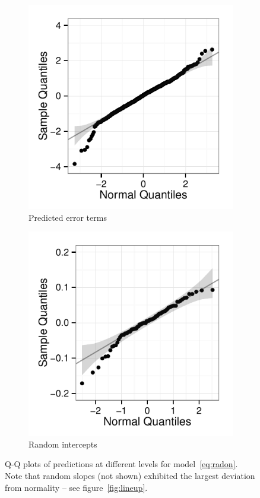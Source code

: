\documentclass[11pt]{article} %
\begin{document}
\begin{figure}[htb]
	\centering
	  \begin{subfigure}[b]{0.4\linewidth}
		\includegraphics[width=\linewidth]{raw-lev1-qq.pdf}
		\caption{Predicted error terms}
	  \end{subfigure}	
	  \begin{subfigure}[b]{0.4\linewidth}
	\includegraphics[width=\linewidth]{raw-intercept-qq.pdf}
		\caption{Random intercepts}
	  \end{subfigure}	
	\caption{\label{fig:qqplots1} Q-Q plots of predictions at different levels %
	for model~\eqref{eq:radon}. Note that random slopes (not shown) exhibited the largest deviation from normality -- see figure~\ref{fig:lineup}. }
\end{figure}
\end{document}
